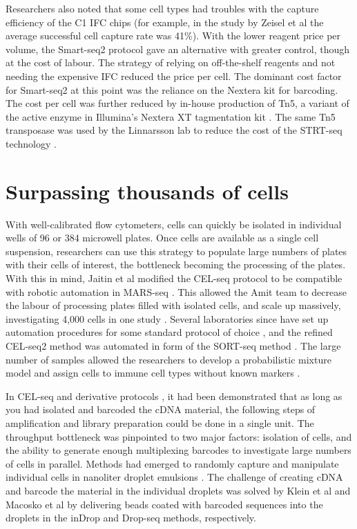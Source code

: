 Researchers also noted that some cell types had troubles with the capture efficiency of the
C1 IFC chips (for example, in the study by Zeisel et al \cite{Zeisel2015-mk} the average successful cell capture
rate was 41\%). With the lower reagent price per volume, the Smart-seq2 protocol gave an alternative with greater control, though at the cost of labour. The strategy of relying on off-the-shelf reagents and not needing the expensive IFC reduced the price per cell. The dominant cost factor for Smart-seq2 at this point was the reliance on the Nextera kit for barcoding. The cost per cell was further reduced by in-house production of Tn5, a variant of the active enzyme in Illumina’s Nextera XT tagmentation kit \cite{Picelli2014-ni}. The same Tn5 transposase was used by the Linnarsson lab to reduce the cost of the STRT-seq technology \cite{Islam2014-dx}.

\section{Surpassing thousands of cells}

With well-calibrated flow cytometers, cells can quickly be isolated in individual wells of 96 or
384 microwell plates. Once cells are available as a single cell suspension, researchers can
use this strategy to populate large numbers of plates with their cells of interest, the
bottleneck becoming the processing of the plates. With this in mind, Jaitin et al modified the
CEL-seq protocol to be compatible with robotic automation in MARS-seq \cite{Jaitin2014-pk}. This allowed the
Amit team to decrease the labour of processing plates filled with isolated cells, and scale up
massively, investigating 4,000 cells in one study \cite{Jaitin2014-pk}. Several laboratories since have set up
automation procedures for some standard protocol of choice \cite{Zeisel2015-mk, Soumillon2014-mf}, and the refined CEL-seq2 method \cite{Hashimshony2016-ul} was automated in form of the SORT-seq method \cite{Muraro2016-zt}. The large number of samples allowed the researchers to develop a probabilistic mixture model and assign cells to immune
cell types without known markers \cite{Jaitin2014-pk}.

In CEL-seq and derivative protocols \cite{Hashimshony2012-am, Jaitin2014-pk, Hashimshony2016-ul, Velten2015-ve}, it had been demonstrated that as long as you had isolated and barcoded the cDNA material, the following steps of amplification and library preparation could be done in a single unit. The throughput bottleneck was pinpointed to two major factors: isolation of cells, and the ability to generate enough multiplexing barcodes to investigate large numbers of cells in parallel. Methods had emerged to randomly capture and manipulate individual cells in nanoliter droplet emulsions \cite{Mazutis2013-rd}. The challenge of creating cDNA and barcode the material in the individual droplets was solved by Klein et al \cite{Klein2015-ti} and Macosko et al \cite{Macosko2015-jb} by delivering beads coated with barcoded sequences into the droplets in the inDrop and Drop-seq methods, respectively.

